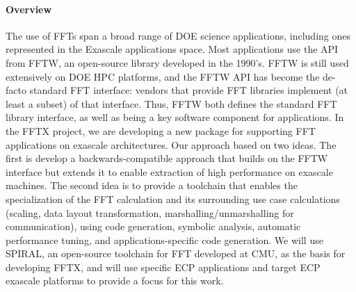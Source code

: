 \paragraph{Overview}
The use of FFTs span a broad range of DOE science applications, including ones represented in the Exascale applications space. Most applications use the API from FFTW, an open-source library developed in the 1990's. FFTW is still used extensively on DOE HPC platforms, and the FFTW API has become the de-facto
standard FFT interface: vendors that provide FFT libraries implement
(at least a subset) of that interface. Thus, FFTW both defines the 
standard FFT library interface, as well as being a key software component
for applications.
In the FFTX project, we are developing a new package for supporting FFT applications on exascale architectures. Our approach based on two ideas. The first is develop a backwards-compatible approach that builds on the FFTW interface but extends it to enable extraction of high performance on exascale machines. The second idea is to provide a toolchain that enables the
specialization of the FFT calculation and its surrounding use case calculations (scaling, data layout transformation, marshalling/unmarshalling for communication), using code generation, symbolic analysis, automatic performance tuning, and applications-specific code generation. We will use SPIRAL, an open-source toolchain for FFT developed at CMU, as the basis for developing FFTX, and will use specific ECP applications and target ECP exascale platforms to provide a focus for this work.

